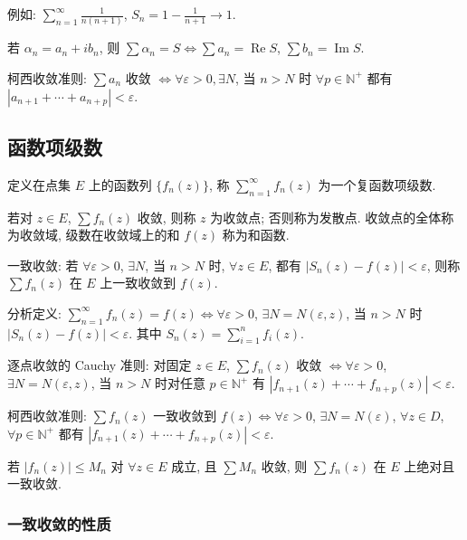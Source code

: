 \documentclass[theorem=false,mathfont=none,openany,sub3section]{easybook}
\begin{document}
例如: $\sum_{n=1}^{\infty}\frac{1}{n(n+1)}$, $S_{n}=1-\frac{1}{n+1}\to1$.

若 $\alpha_{n}=a_{n}+ib_{n}$, 则 $\sum\alpha_{n}=S\Leftrightarrow\sum a_{n}=\operatorname{Re}S$, $\sum b_{n}=\operatorname{Im}S$.

柯西收敛准则: $\sum a_{n}$ 收敛 $\Leftrightarrow\forall\varepsilon>0,\exists N$, 当 $n>N$ 时 $\forall p\in\mathbb{N}^{+}$ 都有 $|a_{n+1}+\cdots+a_{n+p}|<\varepsilon$.

\subsection{函数项级数}

\begin{definition}
  定义在点集 $E$ 上的函数列 $\{f_{n}(z)\}$, 称 $\sum_{n=1}^{\infty}f_{n}(z)$ 为一个复函数项级数.\par
  若对 $z\in E$, $\sum f_{n}(z)$ 收敛, 则称 $z$ 为收敛点; 否则称为发散点.
  收敛点的全体称为收敛域, 级数在收敛域上的和 $f(z)$ 称为和函数.
\end{definition}

一致收敛: 若 $\forall\varepsilon>0$, $\exists N$, 当 $n>N$ 时, $\forall z\in E$, 都有 $|S_{n}(z)-f(z)|<\varepsilon$, 则称 $\sum f_{n}(z)$ 在 $E$ 上一致收敛到 $f(z)$.

分析定义: $\sum_{n=1}^{\infty}f_{n}(z)=f(z)\Leftrightarrow\forall\varepsilon>0$, $\exists N=N(\varepsilon,z)$, 当 $n>N$ 时 $|S_{n}(z)-f(z)|<\varepsilon$. 其中 $S_{n}(z)=\sum_{i=1}^{n}f_{i}(z)$.

逐点收敛的 Cauchy 准则: 对固定 $z\in E$, $\sum f_n(z)$ 收敛
$\Leftrightarrow\forall\varepsilon>0$, $\exists N=N(\varepsilon,z)$, 当 $n>N$ 时对任意 $p\in\mathbb N^+$ 有
$|f_{n+1}(z)+\cdots+f_{n+p}(z)|<\varepsilon$.

柯西收敛准则: $\sum f_{n}(z)$ 一致收敛到 $f(z)\Leftrightarrow\forall\varepsilon>0$, $\exists N=N(\varepsilon)$, $\forall z\in D$, $\forall p\in\mathbb{N}^{+}$ 都有 $|f_{n+1}(z)+\cdots+f_{n+p}(z)|<\varepsilon$.

\begin{theorem}
  若 $|f_{n}(z)|\leq M_{n}$ 对 $\forall z\in E$ 成立, 且 $\sum M_{n}$ 收敛, 则 $\sum f_{n}(z)$ 在 $E$ 上绝对且一致收敛.
\end{theorem}

\subsubsection{一致收敛的性质}
\end{document}
